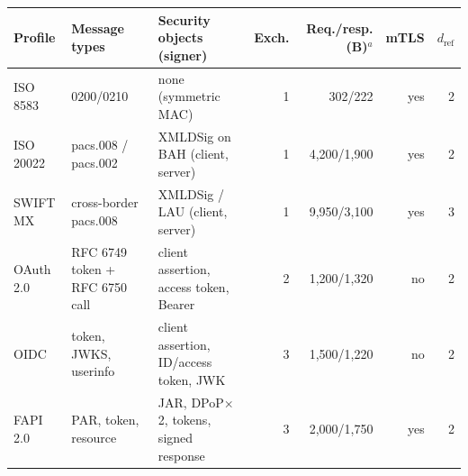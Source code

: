 \begin{tabular}{@{}lllrrrr@{}}
\toprule
Profile & Message types & Security objects (signer) & Exch. & Req./resp. (B)$^{a}$ & mTLS & $d_\text{ref}$ \\
\midrule
ISO 8583 & 0200/0210 & none (symmetric MAC) & 1 & 302/222 & yes & 2 \\
ISO 20022 & pacs.008 / pacs.002 & XMLDSig on BAH (client{,} server) & 1 & 4{,}200/1{,}900 & yes & 2 \\
SWIFT MX & cross-border pacs.008 & XMLDSig / LAU (client{,} server) & 1 & 9{,}950/3{,}100 & yes & 3 \\
OAuth 2.0 & RFC 6749 token + RFC 6750 call & client assertion{,} access token{,} Bearer & 2 & 1{,}200/1{,}320 & no & 2 \\
OIDC & token{,} JWKS{,} userinfo & client assertion{,} ID/access token{,} JWK & 3 & 1{,}500/1{,}220 & no & 2 \\
FAPI 2.0 & PAR{,} token{,} resource & JAR{,} DPoP$\times$2{,} tokens{,} signed response & 3 & 2{,}000/1{,}750 & yes & 2 \\
\bottomrule
\end{tabular}
